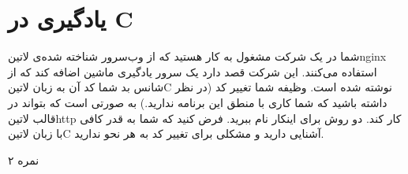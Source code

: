 \documentclass[../main.tex]{subfiles}
\begin{document}
\section{یادگیری در C}

شما در یک شرکت مشغول به کار هستید که از وب‌سرور شناخته شده‌ی ‌لاتین{nginx} استفاده می‌کنند. این شرکت قصد دارد یک سرور یادگیری ماشین اضافه کند که از شانس بد شما کد آن به زبان ‌لاتین{C} نوشته شده است. وظیفه شما تغییر کد (در نظر داشته باشید که شما کاری با منطق این برنامه ندارید.) به صورتی است که بتواند در قالب ‌لاتین{http} کار کند. دو روش برای اینکار نام ببرید. فرض کنید که شما به قدر کافی با زبان ‌لاتین{C} آشنایی دارید و مشکلی برای تغییر کد به هر نحو ندارید.

۲ نمره
\end{document}
